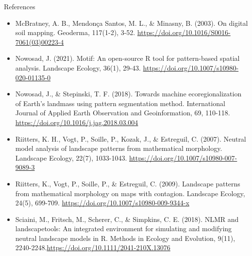 \documentclass[aspectratio=169]{beamer}
\begin{document}
\begin{frame}[allowframebreaks]{References}
\begin{scriptsize}
\begin{itemize}
    \item McBratney, A. B., Mendon\c{c}a Santos, M. L., \& Minasny, B. (2003). On digital soil mapping. Geoderma, 117(1-2), 3-52. \url{https://doi.org/10.1016/S0016-7061(03)00223-4}

    \item Nowosad, J. (2021). Motif: An open-source R tool for pattern-based spatial analysis. Landscape Ecology, 36(1), 29-43. \url{https://doi.org/10.1007/s10980-020-01135-0}

    
    \item Nowosad, J., \& Stepinski, T. F. (2018). Towards machine ecoregionalization of Earth’s landmass using pattern segmentation method. International Journal of Applied Earth Observation and Geoinformation, 69, 110-118. \url{https://doi.org/10.1016/j.jag.2018.03.004}

    \item Riitters, K. H., Vogt, P., Soille, P., Kozak, J., \& Estreguil, C. (2007). Neutral model analysis of landscape patterns from mathematical morphology. Landscape Ecology, 22(7), 1033-1043. \url{https://doi.org/10.1007/s10980-007-9089-3}

    \item Riitters, K., Vogt, P., Soille, P., \& Estreguil, C. (2009). Landscape patterns from mathematical morphology on maps with contagion. Landscape Ecology, 24(5), 699-709. \url{https://doi.org/10.1007/s10980-009-9344-x}

    \item Sciaini, M., Fritsch, M., Scherer, C., \& Simpkins, C. E. (2018). NLMR and landscapetools: An integrated environment for simulating and modifying neutral landscape models in R. Methods in Ecology and Evolution, 9(11), 2240-2248.\url{https://doi.org/10.1111/2041-210X.13076}


    \end{itemize}
        
  \end{scriptsize}

\end{frame}

\end{document}
